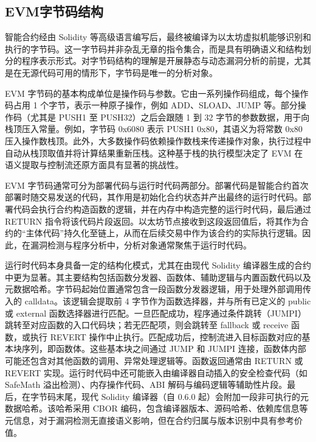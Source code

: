 \documentclass[print, master, vlined, timesmath]{DissertUESTC}
\begin{document}
\subsection{EVM字节码结构}

智能合约经由 Solidity 等高级语言编写后，最终被编译为以太坊虚拟机能够识别和执行的字节码\cite{}。这一字节码并非杂乱无章的指令集合，而是具有明确语义和结构划分的程序表示形式。对字节码结构的理解是开展静态与动态漏洞分析的前提，尤其是在无源代码可用的情形下，字节码是唯一的分析对象。

EVM 字节码的基本构成单位是操作码与参数。它由一系列操作码组成，每个操作码占用 1 个字节，表示一种原子操作，例如 ADD、SLOAD、JUMP 等\cite{}。部分操作码（尤其是 PUSH1 至 PUSH32）之后会跟随 1 到 32 字节的参数数据，用于向栈顶压入常量。例如，字节码 0x6080 表示 PUSH1 0x80，其语义为将常数 0x80 压入操作数栈顶。此外，大多数操作码依赖操作数栈来传递操作对象，执行过程中自动从栈顶取值并将计算结果重新压栈。这种基于栈的执行模型决定了 EVM 在语义提取与控制流还原方面具有显著的挑战性\cite{}。

EVM 字节码通常可分为部署代码与运行时代码两部分\cite{}。部署代码是智能合约首次部署时随交易发送的代码，其作用是初始化合约状态并产出最终的运行时代码。部署代码会执行合约构造函数的逻辑，并在内存中构造完整的运行时代码，最后通过 RETURN 指令将该代码片段返回。以太坊节点接收到这段返回值后，将其作为合约的“主体代码”持久化至链上，从而在后续交易中作为该合约的实际执行逻辑。因此，在漏洞检测与程序分析中，分析对象通常聚焦于运行时代码。

运行时代码本身具备一定的结构化模式，尤其在由现代 Solidity 编译器生成的合约中更为显著\cite{}。其主要结构包括函数分发器、函数体、辅助逻辑与内置函数代码以及元数据哈希。字节码起始位置通常包含一段函数分发器逻辑，用于处理外部调用传入的 calldata。该逻辑会提取前 4 字节作为函数选择器\cite{}，并与所有已定义的 public 或 external 函数选择器进行匹配。一旦匹配成功，程序通过条件跳转（JUMPI）跳转至对应函数的入口代码块；若无匹配项，则会跳转至 fallback 或 receive 函数\cite{}，或执行 REVERT 操作中止执行。匹配成功后，控制流进入目标函数对应的基本块序列，即函数体。这些基本块之间通过 JUMP 和 JUMPI 连接，函数体内部可能还包含对其他函数的调用、异常处理逻辑等。函数返回通常由 RETURN 或 REVERT 实现。运行时代码中还可能嵌入由编译器自动插入的安全检查代码（如 SafeMath 溢出检测\cite{}）、内存操作代码、ABI 解码与编码逻辑等辅助性片段。最后，在字节码末尾，现代 Solidity 编译器（自 0.6.0 起）会附加一段非可执行的元数据哈希\cite{}。该哈希采用 CBOR 编码\cite{}，包含编译器版本、源码哈希、依赖库信息等元信息，对于漏洞检测无直接语义影响，但在合约归属与版本识别中具有参考价值。
\end{document}
